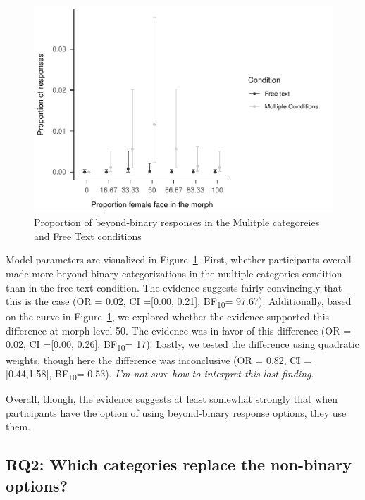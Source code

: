 \documentclass[
  man]{apa7}
\begin{document}
\begin{figure}
\centering
\includegraphics{resp_opts_manus23022_files/figure-latex/exp-one-inf-1.pdf}
\caption{\label{fig:exp-one-inf}Proportion of beyond-binary responses in the Mulitple categoreies and Free Text conditions}
\end{figure}

Model parameters are visualized in Figure~\ref{fig:exp-one-inf}. First, whether participants overall made more beyond-binary categorizations in the multiple categories condition than in the free text condition. The evidence suggests fairly convincingly that this is the case (OR = 0.02, CI ={[}0.00, 0.21{]}, BF\textsubscript{10}= 97.67). Additionally, based on the curve in Figure~\ref{fig:exp-one-inf}, we explored whether the evidence supported this difference at morph level 50. The evidence was in favor of this difference (OR = 0.02, CI ={[}0.00, 0.26{]}, BF\textsubscript{10}= 17). Lastly, we tested the difference using quadratic weights, though here the difference was inconclusive (OR = 0.82, CI = {[}0.44,1.58{]}, BF\textsubscript{10}= 0.53). \emph{I'm not sure how to interpret this last finding}.

Overall, though, the evidence suggests at least somewhat strongly that when participants have the option of using beyond-binary response options, they use them.

\hypertarget{rq2-which-categories-replace-the-non-binary-options}{%
\subsection{RQ2: Which categories replace the non-binary options?}\label{rq2-which-categories-replace-the-non-binary-options}}
\end{document}
